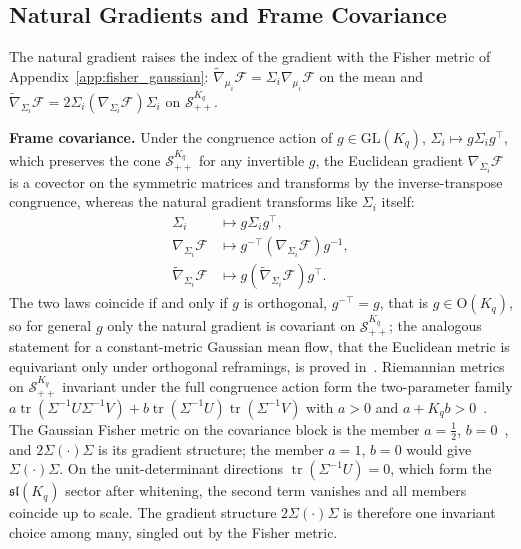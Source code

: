 \documentclass[11pt]{article}
\begin{document}
\subsection*{Natural Gradients and Frame Covariance}

The natural gradient raises the index of the gradient with the Fisher metric of Appendix~\ref{app:fisher_gaussian}: $\tilde{\nabla}_{\mu_i} \mathcal{F} = \Sigma_i \nabla_{\mu_i} \mathcal{F}$ on the mean and $\tilde{\nabla}_{\Sigma_i} \mathcal{F} = 2\Sigma_i (\nabla_{\Sigma_i} \mathcal{F}) \Sigma_i$ on $\mathcal{S}_{++}^{K_q}$.

\textbf{Frame covariance.} Under the congruence action of $g \in \mathrm{GL}(K_q)$, $\Sigma_i \mapsto g\Sigma_i g^\top$, which preserves the cone $\mathcal{S}_{++}^{K_q}$ for any invertible $g$, the Euclidean gradient $\nabla_{\Sigma_i}\mathcal{F}$ is a covector on the symmetric matrices and transforms by the inverse-transpose congruence, whereas the natural gradient transforms like $\Sigma_i$ itself:
\begin{align}
\Sigma_i &\mapsto g\Sigma_i g^\top, \\
\nabla_{\Sigma_i} \mathcal{F} &\mapsto g^{-\top}(\nabla_{\Sigma_i} \mathcal{F})g^{-1}, \\
\tilde{\nabla}_{\Sigma_i} \mathcal{F} &\mapsto g(\tilde{\nabla}_{\Sigma_i} \mathcal{F})g^\top.
\end{align}
The two laws coincide if and only if $g$ is orthogonal, $g^{-\top} = g$, that is $g \in \mathrm{O}(K_q)$, so for general $g$ only the natural gradient is covariant on $\mathcal{S}_{++}^{K_q}$; the analogous statement for a constant-metric Gaussian mean flow, that the Euclidean metric is equivariant only under orthogonal reframings, is proved in~\cite[Ch.~G8]{DennisGaugeVFESuppG2026}. Riemannian metrics on $\mathcal{S}_{++}^{K_q}$ invariant under the full congruence action form the two-parameter family $a\operatorname{tr}(\Sigma^{-1}U\Sigma^{-1}V) + b\operatorname{tr}(\Sigma^{-1}U)\operatorname{tr}(\Sigma^{-1}V)$ with $a > 0$ and $a + K_q b > 0$~\cite{Pennec2009}. The Gaussian Fisher metric on the covariance block is the member $a = \tfrac{1}{2}$, $b = 0$~\cite[Ch.~G5]{DennisGaugeVFESuppG2026}, and $2\Sigma(\cdot)\Sigma$ is its gradient structure; the member $a = 1$, $b = 0$ would give $\Sigma(\cdot)\Sigma$. On the unit-determinant directions $\operatorname{tr}(\Sigma^{-1}U) = 0$, which form the $\mathfrak{sl}(K_q)$ sector after whitening, the second term vanishes and all members coincide up to scale. The gradient structure $2\Sigma(\cdot)\Sigma$ is therefore one invariant choice among many, singled out by the Fisher metric.
\end{document}

